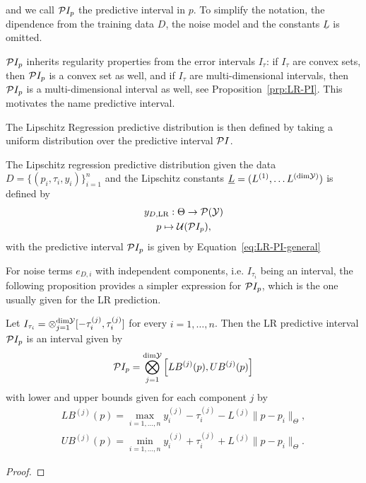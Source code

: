 and we call $\mathcal P I_p$ the predictive interval in $p$.
To simplify the notation, the dipendence from the training data $D$, the noise model and the constants $\underline L$ is omitted.
\begin{rmk}
    $\mathcal PI_p$ inherits regularity properties from the error intervals $I_\tau$: if $I_\tau$ are convex sets, then $\mathcal PI_p$ is a convex set as well, and if $I_\tau$ are multi-dimensional intervals, then $\mathcal PI_p$ is a multi-dimensional interval as well, see Proposition~\ref{prp:LR-PI}. 
    This motivates the name predictive interval. 
\end{rmk}

The Lipschitz Regression predictive distribution is then defined by taking a uniform distribution over the predictive interval $\mathcal P I$.
\begin{dfn}  \label{dfn:LR}
    The Lipschitz regression predictive distribution given the data $D=\{ (p_i, \tau_i, y_i) \}_{i=1}^n$ and the Lipschitz constants $\underline{L} = (L^{(1)},\dots L^{(\text{dim}\mathcal Y)})$ is defined by
    \begin{gather*}
        y_{D, \text{LR}} : \Theta \rightarrow \mathcal P( \mathcal Y) \\
        p \mapsto \mathcal U( \mathcal PI_p ),
    \end{gather*}
    with the predictive interval $\mathcal PI_p$ is given by Equation~\eqref{eq:LR-PI-general}
\end{dfn}

For noise terms $e_{D,i}$ with independent components, i.e. $I_{\tau_i}$ being an interval, the following proposition provides a simpler expression for $\mathcal PI_p$, which is the one usually given for the LR prediction.
\begin{prp}\label{prp:LR-PI}
    Let $I_{\tau_i} = \otimes_{j=1}^{\text{dim}\mathcal Y} [ -\tau_i^{(j)}, \tau_i^{(j)} ]$ for every $i = 1, \dots, n$.
    Then the LR predictive interval $\mathcal PI_p$ is an interval given by
    \begin{equation}\label{eq:LR-PI}
        \mathcal PI_p = \bigotimes_{j=1}^{\text{dim}\mathcal Y} \left[ LB^{(j)}(p), UB^{(j)}(p)\right]
    \end{equation}
    with lower and upper bounds given for each component $j$ by
    \begin{equation} \label{LR-bounds}
    \begin{gathered}
        LB^{(j)}(p) = \max_{i=1,\dots,n} y_i^{(j)} - \tau_i^{(j)} - L^{(j)} \| p - p_i \|_\Theta, \\
        UB^{(j)}(p) = \min_{i=1,\dots,n} y_i^{(j)} + \tau_i^{(j)} + L^{(j)} \| p - p_i \|_\Theta.
    \end{gathered}
    \end{equation}
\end{prp}
\begin{proof}
\end{proof}

